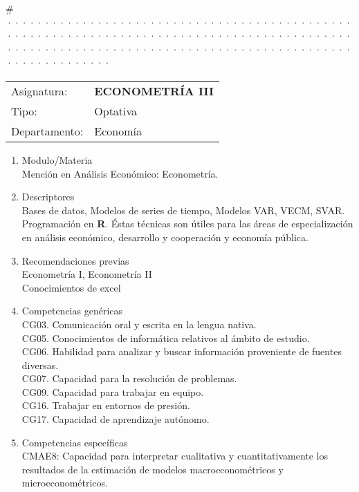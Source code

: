 \documentclass{article}\usepackage[]{graphicx}\usepackage[]{color}
\begin{document}
# ························································································································································

\vspace{5pt}
\begin{center}
\begin{tabular}{l l}
Asignatura: &\textbf{ECONOMETRÍA III}\\
Tipo: &Optativa\\
Departamento: &Economía
\end{tabular}
\end{center}

\begin{enumerate}
  \item Modulo/Materia\\
  Mención en Análisis Económico: Econometría.

  \item Descriptores\\
  Bases de datos, Modelos de series de tiempo, Modelos VAR, VECM, SVAR. Programación en \textbf{\textsf{R}}. Éstas técnicas son útiles para las áreas de especialización en análisis económico, desarrollo y cooperación y economía pública.

  \item Recomendaciones previas\\
        Econometría I, Econometría II\\
        Conocimientos de excel

  \item Competencias genéricas\\
        CG03. Comunicación oral y escrita en la lengua nativa.\\
        CG05. Conocimientos de informática relativos al ámbito de estudio.\\
        CG06. Habilidad para analizar y buscar información proveniente de fuentes diversas.\\
        CG07. Capacidad para la resolución de problemas.\\
        CG09. Capacidad para trabajar en equipo.\\
        CG16. Trabajar en entornos de presión.\\
        CG17. Capacidad de aprendizaje autónomo.

  \item Competencias específicas\\
        CMAE8: Capacidad para interpretar cualitativa y cuantitativamente los resultados de la estimación de modelos macroeconométricos y microeconométricos.


\end{enumerate}
\end{document}
